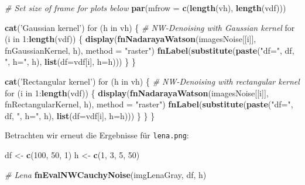 \documentclass[10pt,]{article}
\newenvironment{Shaded}{\begin{snugshade}}{\end{snugshade}}
\newcommand{\KeywordTok}[1]{\textcolor[rgb]{0.13,0.29,0.53}{\textbf{{#1}}}}
\newcommand{\DataTypeTok}[1]{\textcolor[rgb]{0.13,0.29,0.53}{{#1}}}
\newcommand{\DecValTok}[1]{\textcolor[rgb]{0.00,0.00,0.81}{{#1}}}
\newcommand{\StringTok}[1]{\textcolor[rgb]{0.31,0.60,0.02}{{#1}}}
\newcommand{\CommentTok}[1]{\textcolor[rgb]{0.56,0.35,0.01}{\textit{{#1}}}}
\newcommand{\NormalTok}[1]{{#1}}
\begin{document}
\begin{Shaded}
\begin{Highlighting}[]
  \CommentTok{# Set size of frame for plots below}
  \KeywordTok{par}\NormalTok{(}\DataTypeTok{mfrow =} \KeywordTok{c}\NormalTok{(}\KeywordTok{length}\NormalTok{(vh), }\KeywordTok{length}\NormalTok{(vdf)))}
  
  \KeywordTok{cat}\NormalTok{(}\StringTok{'Gaussian kernel'}\NormalTok{)}
  \NormalTok{for (h in vh) \{}
    \CommentTok{# NW-Denoising with Gaussian kernel}
    \NormalTok{for (i in }\DecValTok{1}\NormalTok{:}\KeywordTok{length}\NormalTok{(vdf)) \{}
      \KeywordTok{display}\NormalTok{(}\KeywordTok{fnNadarayaWatson}\NormalTok{(imagesNoise[[i]], fnGaussianKernel, h),}
              \DataTypeTok{method =} \StringTok{"raster"}\NormalTok{)}
      \KeywordTok{fnLabel}\NormalTok{(}\KeywordTok{substitute}\NormalTok{(}\KeywordTok{paste}\NormalTok{(}\StringTok{"df="}\NormalTok{, df, }\StringTok{", h="}\NormalTok{, h),}
                         \KeywordTok{list}\NormalTok{(}\DataTypeTok{df=}\NormalTok{vdf[i], }\DataTypeTok{h=}\NormalTok{h)))}
    \NormalTok{\}}
  \NormalTok{\}}
  
  \KeywordTok{cat}\NormalTok{(}\StringTok{'Rectangular kernel'}\NormalTok{)}
  \NormalTok{for (h in vh) \{ }
    \CommentTok{# NW-Denoising with rectangular kernel}
    \NormalTok{for (i in }\DecValTok{1}\NormalTok{:}\KeywordTok{length}\NormalTok{(vdf)) \{}
      \KeywordTok{display}\NormalTok{(}\KeywordTok{fnNadarayaWatson}\NormalTok{(imagesNoise[[i]], fnRectangularKernel, h), }
              \DataTypeTok{method =} \StringTok{"raster"}\NormalTok{)}
      \KeywordTok{fnLabel}\NormalTok{(}\KeywordTok{substitute}\NormalTok{(}\KeywordTok{paste}\NormalTok{(}\StringTok{"df="}\NormalTok{, df, }\StringTok{", h="}\NormalTok{, h),}
                         \KeywordTok{list}\NormalTok{(}\DataTypeTok{df=}\NormalTok{vdf[i], }\DataTypeTok{h=}\NormalTok{h)))}
    \NormalTok{\}}
  \NormalTok{\}}
\NormalTok{\}}
\end{Highlighting}
\end{Shaded}

Betrachten wir erneut die Ergebnisse für \texttt{lena.png}:

\begin{Shaded}
\begin{Highlighting}[]
\NormalTok{df <-}\StringTok{ }\KeywordTok{c}\NormalTok{(}\DecValTok{100}\NormalTok{, }\DecValTok{50}\NormalTok{, }\DecValTok{1}\NormalTok{)}
\NormalTok{h <-}\StringTok{ }\KeywordTok{c}\NormalTok{(}\DecValTok{1}\NormalTok{, }\DecValTok{3}\NormalTok{, }\DecValTok{5}\NormalTok{, }\DecValTok{50}\NormalTok{)}

\CommentTok{# Lena}
\KeywordTok{fnEvalNWCauchyNoise}\NormalTok{(imgLenaGray, df, h)}
\end{Highlighting}
\end{Shaded}
\end{document}
